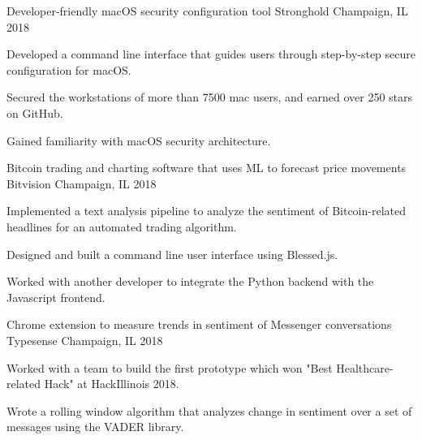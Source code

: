 

\begin{cventries}
\cventry
{Developer-friendly macOS security configuration tool} %
{Stronghold} %
{Champaign, IL} %
{2018} %
{
	\begin{cvitems} %
		\item {Developed a command line interface that guides users through step-by-step secure configuration for macOS.}
		\item {Secured the workstations of more than 7500 mac users, and earned over 250 stars on GitHub.}
		\item{Gained familiarity with macOS security architecture.} 
	\end{cvitems}
}
\cventry
{Bitcoin trading and charting software that uses ML to forecast price movements} %
{Bitvision} %
{Champaign, IL} %
{2018} %
{
	\begin{cvitems} %
		\item {Implemented a text analysis pipeline to analyze the sentiment of Bitcoin-related headlines for an automated trading algorithm.}
		\item {Designed and built a command line user interface using Blessed.js.}
		\item {Worked with another developer to integrate the Python backend with the Javascript frontend.}
	\end{cvitems}
}

\cventry
{Chrome extension to measure trends in sentiment of Messenger conversations} %
{Typesense} %
{Champaign, IL} %
{2018} %
{
	\begin{cvitems} %
		\item {Worked with a team to build the first prototype which won "Best Healthcare-related Hack" at HackIllinois 2018.}
		\item {Wrote a rolling window algorithm that analyzes change in sentiment over a set of messages using the VADER library.}
	\end{cvitems}
}


\end{cventries}
